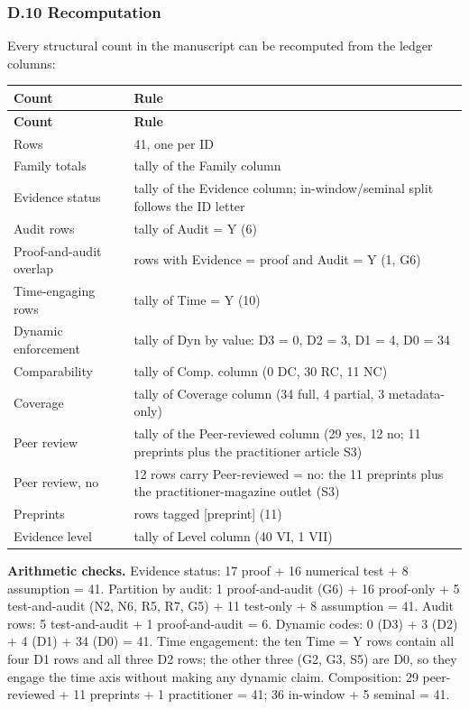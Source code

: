 \documentclass[11pt]{article}
\begin{document}
\subsubsection*{D.10 Recomputation}
Every structural count in the manuscript can be recomputed from the ledger columns:

\begingroup
\begin{longtable}{@{}p{}p{}@{}}
\toprule
\textbf{Count} & \textbf{Rule} \\
\midrule
\endfirsthead
\toprule
\textbf{Count} & \textbf{Rule} \\
\midrule
\endhead
Rows & 41, one per ID \\
Family totals & tally of the Family column \\
Evidence status & tally of the Evidence column; in-window/seminal split follows the ID letter \\
Audit rows & tally of Audit = Y (6) \\
Proof-and-audit overlap & rows with Evidence = proof and Audit = Y (1, G6) \\
Time-engaging rows & tally of Time = Y (10) \\
Dynamic enforcement & tally of Dyn by value: D3 = 0, D2 = 3, D1 = 4, D0 = 34 \\
Comparability & tally of Comp. column (0 DC, 30 RC, 11 NC) \\
Coverage & tally of Coverage column (34 full, 4 partial, 3 metadata-only) \\
Peer review & tally of the Peer-reviewed column (29 yes, 12 no; 11 preprints plus the practitioner article S3) \\
Peer review, no & 12 rows carry Peer-reviewed = no: the 11 preprints plus the practitioner-magazine outlet (S3) \\
Preprints & rows tagged [preprint] (11) \\
Evidence level & tally of Level column (40 VI, 1 VII) \\
\bottomrule
\end{longtable}
\endgroup

\textbf{Arithmetic checks.} Evidence status: 17 proof + 16 numerical test + 8 assumption = 41. Partition by audit: 1 proof-and-audit (G6) + 16 proof-only + 5 test-and-audit (N2, N6, R5, R7, G5) + 11 test-only + 8 assumption = 41. Audit rows: 5 test-and-audit + 1 proof-and-audit = 6. Dynamic codes: 0 (D3) + 3 (D2) + 4 (D1) + 34 (D0) = 41. Time engagement: the ten Time = Y rows contain all four D1 rows and all three D2 rows; the other three (G2, G3, S5) are D0, so they engage the time axis without making any dynamic claim. Composition: 29 peer-reviewed + 11 preprints + 1 practitioner = 41; 36 in-window + 5 seminal = 41.
\end{document}
